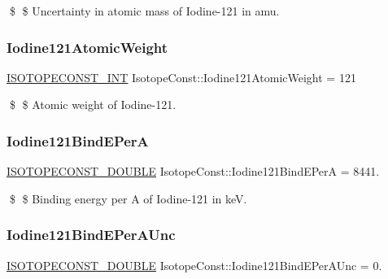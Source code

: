 \$ \$ Uncertainty in atomic mass of Iodine-\/121 in amu. \mbox{\label{group___isotope_const-_iodine-_i121_gac9f121096422df8cede40f532d7f5757}} 
\subsubsection{\texorpdfstring{Iodine121\+Atomic\+Weight}{Iodine121AtomicWeight}}
{\footnotesize\ttfamily \mbox{\hyperlink{group___isotope_const-_macros_ga5f18360b3e99483a35c32d789e62621c}{I\+S\+O\+T\+O\+P\+E\+C\+O\+N\+S\+T\+\_\+\+I\+NT}} Isotope\+Const\+::\+Iodine121\+Atomic\+Weight = 121}

\$ \$ Atomic weight of Iodine-\/121. \mbox{\label{group___isotope_const-_iodine-_i121_ga26b4c3e53ec6a9d7c84068f998a21f9e}} 
\subsubsection{\texorpdfstring{Iodine121\+Bind\+E\+PerA}{Iodine121BindEPerA}}
{\footnotesize\ttfamily \mbox{\hyperlink{group___isotope_const-_macros_ga8f45a7272ce02c0b4c65c44636ed719a}{I\+S\+O\+T\+O\+P\+E\+C\+O\+N\+S\+T\+\_\+\+D\+O\+U\+B\+LE}} Isotope\+Const\+::\+Iodine121\+Bind\+E\+PerA = 8441.}

\$ \$ Binding energy per A of Iodine-\/121 in keV. \mbox{\label{group___isotope_const-_iodine-_i121_gad925239fb19be2be569cbd036812556a}} 
\subsubsection{\texorpdfstring{Iodine121\+Bind\+E\+Per\+A\+Unc}{Iodine121BindEPerAUnc}}
{\footnotesize\ttfamily \mbox{\hyperlink{group___isotope_const-_macros_ga8f45a7272ce02c0b4c65c44636ed719a}{I\+S\+O\+T\+O\+P\+E\+C\+O\+N\+S\+T\+\_\+\+D\+O\+U\+B\+LE}} Isotope\+Const\+::\+Iodine121\+Bind\+E\+Per\+A\+Unc = 0.}

